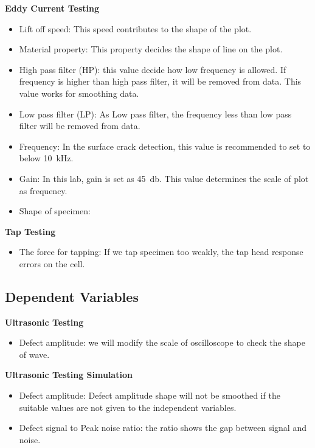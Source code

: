 \documentclass[12 pt]{report}
\begin{document}
\textbf{Eddy Current Testing}

\begin{itemize}
	\item Lift off speed: This speed contributes to the shape of the plot.
	\item Material property: This property decides the shape of line on the plot.
	\item High pass filter (HP): this value decide how low frequency is allowed. If frequency is higher than high pass filter, it will be removed from data. This value works for smoothing data.
	\item Low pass filter (LP): As Low pass filter, the frequency less than low pass filter will be removed from data.
	\item Frequency: In the surface crack detection, this value is recommended to set to below \qty{10}{\kilo\hertz}.
	\item Gain: In this lab, gain is set as \qty{45}{\decibel}. This value determines the scale of plot as frequency.
	\item Shape of specimen:
\end{itemize}

\textbf{Tap Testing}

\begin{itemize}
	\item The force for tapping: If we tap specimen too weakly, the tap head response errors on the cell.
\end{itemize}

\subsection{Dependent Variables} \label{variables-dependent_variables}
\textbf{Ultrasonic Testing}

\begin{itemize}
	\item Defect amplitude: we will modify the scale of oscilloscope to check the shape of wave.
\end{itemize} 

\textbf{Ultrasonic Testing Simulation}

\begin{itemize}
	\item Defect amplitude: Defect amplitude shape will not be smoothed if the suitable values are not given to the independent variables.
	\item Defect signal to Peak noise ratio: the ratio shows the gap between signal and noise.
\end{itemize}
\end{document}
